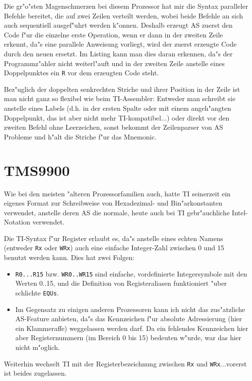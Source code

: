\documentclass[12pt,a4paper,twoside]{report}
\newcommand{\tty}[1]{{\tt #1}}
\begin{document}
Die gr"o"sten Magenschmerzen bei diesem Prozessor hat mir die Syntax
paralleler Befehle bereitet, die auf zwei Zeilen verteilt werden,
wobei beide Befehle an sich auch sequentiell ausgef"uhrt werden k"onnen.
Deshalb erzeugt AS zuerst den Code f"ur die einzelne erste Operation,
wenn er dann in der zweiten Zeile erkennt, da"s eine parallele Anweisung
vorliegt, wird der zuerst erzeugte Code durch den neuen ersetzt.
Im Listing kann man dies daran erkennen, da"s der Programmz"ahler
nicht weiterl"auft und in der zweiten Zeile anstelle eines Doppelpunktes
ein \tty{R} vor dem erzeugten Code steht.
\par
Bez"uglich der doppelten senkrechten Striche und ihrer Position in der
Zeile ist man nicht ganz so flexibel wie beim TI-Assembler: Entweder
man schreibt sie anstelle eines Labels (d.h. in der ersten Spalte oder
mit einem angeh"angten Doppelpunkt, das ist aber nicht mehr
TI-kompatibel...) oder direkt vor den zweiten Befehl ohne Leerzeichen,
sonst bekommt der Zeilenparser von AS Probleme und h"alt die Striche
f"ur das Mnemonic.


\section{TMS9900}

Wie bei den meisten "alteren Prozessorfamilien auch, hatte TI seinerzeit
ein eigenes Format zur Schreibweise von Hexadezimal- und Bin"arkonstanten
verwendet, anstelle deren AS die normale, heute auch bei TI
gebr"auchliche Intel-Notation verwendet.

Die TI-Syntax f"ur Register erlaubt es, da"s anstelle eines echten Namens
(entweder \tty{Rx} oder \tty{WRx}) auch eine einfache Integer-Zahl
zwischen 0 und 15 benutzt werden kann.  Dies hat zwei Folgen:
\begin{itemize}
\item{\tty{R0...R15} bzw. \tty{WR0..WR15} sind einfache, vordefinierte
      Integersymbole mit den Werten 0..15, und die Definition von
      Registeraliasen funktioniert "uber schlichte \tty{EQUs}.}
\item{Im Gegensatz zu einigen anderen Prozessoren kann ich nicht das
      zus"atzliche AS-Feature anbieten, da"s das Kennzeichen f"ur
      absolute Adressierung (hier ein Klammeraffe) weggelassen werden
      darf.  Da ein fehlendes Kennzeichen hier aber Registernummern (im
      Bereich 0 bis 15) bedeuten w"urde, war das hier nicht m"oglich.}
\end{itemize}
Weiterhin wechselt TI mit der Registerbezeichnung zwischen \tty{Rx} und
\tty{WRx}...vorerst ist beides zugelassen.
\end{document}
